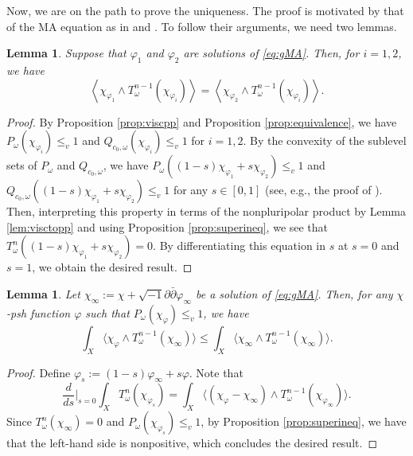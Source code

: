 \documentclass[10pt,a4paper]{amsart}
\numberwithin{equation}{section}
\newtheorem{lem}[equation]{Lemma}
\newcommand{\delb}{\sqrt{-1}\partial\bar{\partial}}
\begin{document}
Now, we are on the path to prove the uniqueness. The proof is motivated by that of the MA equation as in \cite[Section 3]{BEGZ} and \cite{Dinew}. To follow their arguments, we need two lemmas.

\begin{lem}\label{lem:uni}
     Suppose that $\varphi_1$ and $\varphi_2$ are solutions of \eqref{eq:gMA}. Then, for $i=1,2$, we have
     $$\left\langle\chi_{\varphi_1}\wedge T^{n-1}_\omega(\chi_{\varphi_i})\right\rangle=\left\langle\chi_{\varphi_2}\wedge T^{n-1}_\omega(\chi_{\varphi_i})\right\rangle.$$
\end{lem}

\begin{proof}
    By Proposition \ref{prop:viscpp} and Proposition \ref{prop:equivalence}, we have $P_\omega(\chi_{\varphi_i})\le_v1$ and $Q_{c_0,\omega}(\chi_{\varphi_i})\le_v 1$ for $i=1,2$. By the convexity of the sublevel sets of $P_\omega$ and $Q_{c_0,\omega}$, we have $P_\omega((1-s)\chi_{\varphi_1}+s\chi_{\varphi_2})\le_v 1$ and $Q_{c_0,\omega}((1-s)\chi_{\varphi_1}+s\chi_{\varphi_2})\le_v 1$ for any $s\in[0,1]$ (see, e.g., the proof of \cite[Theorem 5.8]{CC}). Then, interpreting this property in terms of the nonpluripolar product by Lemma \ref{lem:visctopp} and using Proposition \ref{prop:superineq}, we see that 
    $T^n_\omega((1-s)\chi_{\varphi_1}+s\chi_{\varphi_2})=0$. By differentiating this equation in $s$ at $s=0$ and $s=1$, we obtain the desired result.
\end{proof}

\begin{lem}\label{lem:solineq}
    Let $\chi_\infty:=\chi+\delb\varphi_\infty$ be a solution of \eqref{eq:gMA}. Then, for any $\chi$-psh function $\varphi$ such that $P_\omega(\chi_\varphi)\le_v 1$, we have
    $$\int_X\big\langle\chi_\varphi\wedge T^{n-1}_\omega(\chi_\infty)\big\rangle\le \int_X\big\langle \chi_\infty\wedge T^{n-1}_\omega(\chi_\infty)\big\rangle.$$
\end{lem}

\begin{proof}
    Define $\varphi_s:=(1-s)\varphi_\infty+s\varphi$. Note that
    \begin{equation*}
        \frac{d}{ds}\Bigg\vert_{s=0}\int_X T^n_\omega(\chi_{\varphi_s})=\int_X \big\langle(\chi_\varphi-\chi_\infty)\wedge T^{n-1}_\omega(\chi_{\varphi_\infty})\big\rangle.
    \end{equation*}
    Since $T^n_\omega(\chi_\infty)=0$ and $P_{\omega}(\chi_{\varphi_s})\le_v1$, by Proposition \ref{prop:superineq}, we have that the left-hand side is nonpositive, which concludes the desired result.
\end{proof}
\end{document}
